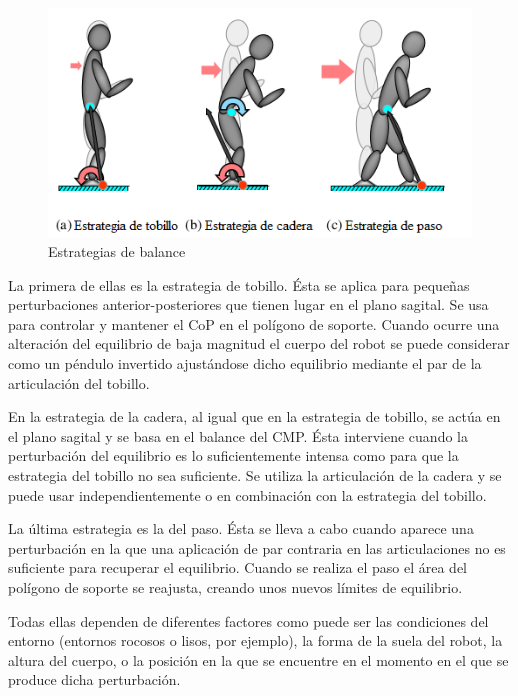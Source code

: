 \begin{figure}[H]
\centering
\includegraphics[scale=0.8]{imagenes/apartado_4/49_balance_strategies}
\caption{Estrategias de balance}
\label{figura49}
\end{figure}

La primera de ellas es la estrategia de tobillo. Ésta se aplica para pequeñas perturbaciones anterior-posteriores que tienen lugar en el plano sagital. Se usa para controlar y mantener el CoP en el polígono de soporte. Cuando ocurre una alteración del equilibrio de baja magnitud el cuerpo del robot se puede considerar como un péndulo invertido ajustándose dicho equilibrio mediante el par de la articulación del tobillo. 

En la estrategia de la cadera, al igual que en la estrategia de tobillo, se actúa en el plano sagital y se basa en el balance del CMP. Ésta interviene cuando la perturbación del equilibrio es lo suficientemente intensa como para que la estrategia del tobillo no sea suficiente. Se utiliza la articulación de la cadera y se puede usar independientemente o en combinación con la estrategia del tobillo. 

La última estrategia es la del paso. Ésta se lleva a cabo cuando aparece una perturbación en la que una aplicación de par contraria en las articulaciones no es suficiente para recuperar el equilibrio. Cuando se realiza el paso el área del polígono de soporte se reajusta, creando unos nuevos límites de equilibrio.

Todas ellas dependen de diferentes factores como puede ser las condiciones del entorno (entornos rocosos o lisos, por ejemplo), la forma de la suela del robot, la altura del cuerpo, o la posición en la que se encuentre en el momento en el que se produce dicha perturbación.


\afterpage{\null\newpage}
\newpage